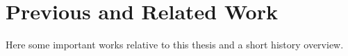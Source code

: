 
\chapter{Previous and Related Work}\label{sec:prev}
Here some important works relative to this thesis and a short history overview.


